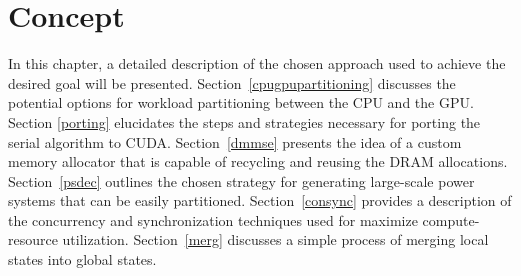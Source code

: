 \documentclass[thesis.tex]{subfiles}
\begin{document}
\chapter{Concept}\label{chap:concept}

In this chapter, a detailed description of the chosen approach used to achieve the desired goal will be presented. Section~\ref{cpugpupartitioning} discusses the potential options for workload partitioning between the CPU and the GPU. Section \ref{porting} elucidates the steps and strategies necessary for porting the serial algorithm to CUDA. Section~\ref{dmmse} presents the idea of a custom memory allocator that is capable of recycling and reusing the DRAM allocations. Section~\ref{psdec} outlines the chosen strategy for generating large-scale power systems that can be easily partitioned. Section~\ref{consync} provides a description of the concurrency and synchronization techniques used for maximize compute-resource utilization. Section~\ref{merg} discusses a simple process of merging local states into global states. 
\end{document}
